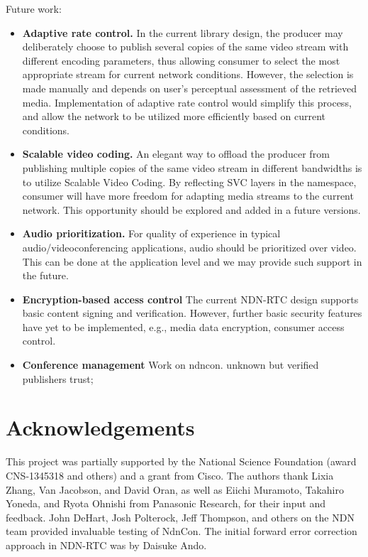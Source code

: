 \documentclass{icn/sig-alternate-2012} %
\newcommand{\ndnrtcName}{NDN-RTC} %
\newcommand{\ndnconName}{NdnCon}
\begin{document}
Future work: 
\begin{itemize}[label={}]
\item \textbf{Adaptive rate control.} In the current library design, the producer may deliberately choose to publish several copies of the same video stream with different encoding parameters, thus allowing consumer to select the most appropriate stream for current network conditions. However, the selection is made manually and depends on user's perceptual assessment of the retrieved media. Implementation of adaptive rate control would simplify this process, and allow the network to be utilized more efficiently based on current conditions.

\item \textbf{Scalable video coding.} An elegant way to offload the producer from publishing multiple copies of the same video stream in different bandwidths is to utilize Scalable Video Coding. By reflecting SVC layers in the namespace, consumer will have more freedom for adapting media streams to the current network. This opportunity should be explored and added in a future versions.

\item \textbf{Audio prioritization.}  For quality of experience in typical audio/videoconferencing applications, audio should be prioritized over video.  This can be done at the application level and we may provide such support in the future. %

\item \textbf{Encryption-based access control} The current \ndnrtcName{} design supports basic content signing and verification. However, further basic security features have yet to be implemented, e.g., media data encryption, consumer access control.

\item \textbf{Conference management} 
Work on ndncon. unknown but verified publishers trust; 
\end{itemize}


\section{Acknowledgements}
\label{sec:Acknowledgements}
This project was partially supported by the National Science Foundation (award CNS-1345318 and others) and a grant from Cisco. The authors thank Lixia Zhang, Van Jacobson, and David Oran, as well as Eiichi Muramoto, Takahiro Yoneda, and Ryota Ohnishi from Panasonic Research, for their input and feedback. John DeHart, Josh Polterock, Jeff Thompson, and others on the NDN team provided invaluable testing of \ndnconName{}.  The initial forward error correction approach in \ndnrtcName{} was by Daisuke Ando. 



\end{document}

